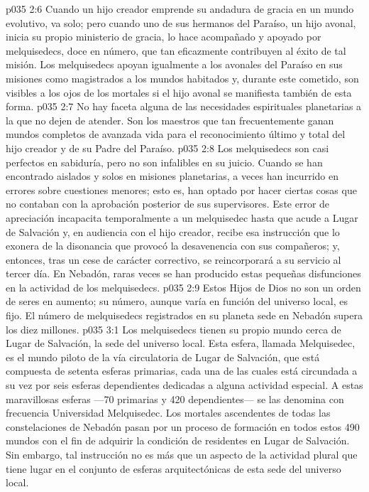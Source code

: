 \vs p035 2:6 Cuando un hijo creador emprende su andadura de gracia en un mundo evolutivo, va solo; pero cuando uno de sus hermanos del Paraíso, un hijo avonal, inicia su propio ministerio de gracia, lo hace acompañado y apoyado por melquisedecs, doce en número, que tan eficazmente contribuyen al éxito de tal misión. Los melquisedecs apoyan igualmente a los avonales del Paraíso en sus misiones como magistrados a los mundos habitados y, durante este cometido, son visibles a los ojos de los mortales si el hijo avonal se manifiesta también de esta forma.
\vs p035 2:7 No hay faceta alguna de las necesidades espirituales planetarias a la que no dejen de atender. Son los maestros que tan frecuentemente ganan mundos completos de avanzada vida para el reconocimiento último y total del hijo creador y de su Padre del Paraíso.
\vs p035 2:8 \pc Los melquisedecs son casi perfectos en sabiduría, pero no son infalibles en su juicio. Cuando se han encontrado aislados y solos en misiones planetarias, a veces han incurrido en errores sobre cuestiones menores; esto es, han optado por hacer ciertas cosas que no contaban con la aprobación posterior de sus supervisores. Este error de apreciación incapacita temporalmente a un melquisedec hasta que acude a Lugar de Salvación y, en audiencia con el hijo creador, recibe esa instrucción que lo exonera de la disonancia que provocó la desavenencia con sus compañeros; y, entonces, tras un cese de carácter correctivo, se reincorporará a su servicio al tercer día. En Nebadón, raras veces se han producido estas pequeñas disfunciones en la actividad de los melquisedecs.
\vs p035 2:9 Estos Hijos de Dios no son un orden de seres en aumento; su número, aunque varía en función del universo local, es fijo. El número de melquisedecs registrados en su planeta sede en Nebadón supera los diez millones.
\vs p035 3:1 Los melquisedecs tienen su propio mundo cerca de Lugar de Salvación, la sede del universo local. Esta esfera, llamada Melquisedec, es el mundo piloto de la vía circulatoria de Lugar de Salvación, que está compuesta de setenta esferas primarias, cada una de las cuales está circundada a su vez por seis esferas dependientes dedicadas a alguna actividad especial. A estas maravillosas esferas ---70 primarias y 420 dependientes--- se las denomina con frecuencia Universidad Melquisedec. Los mortales ascendentes de todas las constelaciones de Nebadón pasan por un proceso de formación en todos estos 490 mundos con el fin de adquirir la condición de residentes en Lugar de Salvación. Sin embargo, tal instrucción no es más que un aspecto de la actividad plural que tiene lugar en el conjunto de esferas arquitectónicas de esta sede del universo local.
